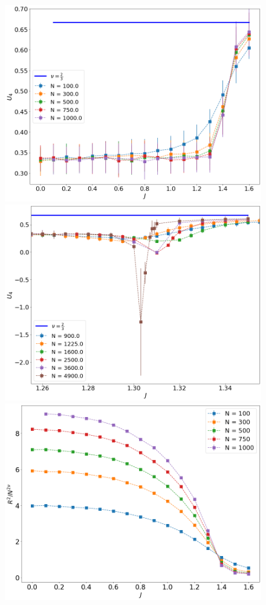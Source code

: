  \begin{figure}[H]
 	\centering
 	\includegraphics[scale=0.23]{Images/bindercumulants_shortchains.png} 	\includegraphics[scale=0.23]{Images/bindercumulants_longchains.png} \\ 
 	 	\includegraphics[scale=0.23]{Images/rscaling_shortchains.png}

\end{figure}
